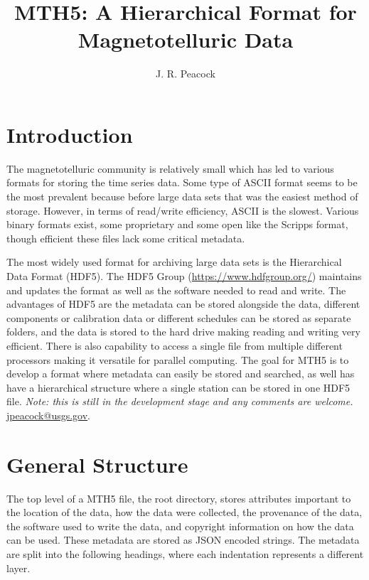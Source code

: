\documentclass{article}
\title{\textbf{MTH5}: A Hierarchical Format for Magnetotelluric Data}
\author[1]{J. R. Peacock}
\affil[1]{U.S. Geological Survey}
\begin{document}
	
\maketitle
	
\newpage

\tableofcontents

\newpage

\section{Introduction}

The magnetotelluric community is relatively small which has led to various formats for storing the time series data.  Some type of ASCII format seems to be the most prevalent because before large data sets that was the easiest method of storage.  However, in terms of read/write efficiency, ASCII is the slowest.  Various binary formats exist, some proprietary and some open like the Scripps format, though efficient these files lack some critical metadata. 

The most widely used format for archiving large data sets is the Hierarchical Data Format (HDF5).  The HDF5 Group (\url{https://www.hdfgroup.org/}) maintains and updates the format as well as the software needed to read and write.  The advantages of HDF5 are the metadata can be stored alongside the data, different components or calibration data or different schedules can be stored as separate folders, and the data is stored to the hard drive making reading and writing very efficient.  There is also capability to access a single file from multiple different processors making it versatile for parallel computing.  The goal for MTH5 is to develop a format where metadata can easily be stored and searched, as well has have a hierarchical structure where a single station can be stored in one HDF5 file.  \textit{Note: this is still in the development stage and any comments are welcome.} \url{jpeacock@usgs.gov}.  

\section{General Structure}

The top level of a MTH5 file, the root directory, stores attributes important to the location of the data, how the data were collected, the provenance of the data, the software used to write the data, and copyright information on how the data can be used.  These metadata are stored as JSON encoded strings.  The metadata are split into the following headings, where each indentation represents a different layer.
\end{document}

